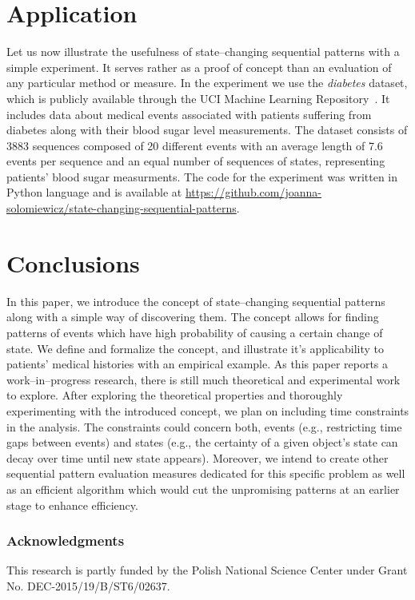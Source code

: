 \documentclass[runningheads,a4paper]{llncs}
\begin{document}
\section{Application}
Let us now illustrate the usefulness of state--changing sequential patterns with a simple experiment.
It serves rather as a proof of concept than an evaluation of any particular method or measure.
In the experiment we use the \textit{diabetes} dataset, which is publicly available through the UCI Machine Learning Repository~\cite{Kahn:1994}.
It includes data about medical events associated with patients suffering from diabetes along with their blood sugar level measurements.
The dataset consists of 3883 sequences composed of 20 different events with an average length of 7.6 events per sequence and an equal number of sequences of states, representing patients' blood sugar measurments.
The code for the experiment was written in Python language and is available at \url{https://github.com/joanna-solomiewicz/state-changing-sequential-patterns}.



\section{Conclusions}
\label{sec:conclusions}
In this paper, we introduce the concept of state--changing sequential patterns along with a simple way of discovering them.
The concept allows for finding patterns of events which have high probability of causing a certain change of state.
We define and formalize the concept, and illustrate it's applicability to patients' medical histories with an empirical example.
As this paper reports a work--in--progress research, there is still much theoretical and experimental work to explore.
After exploring the theoretical properties and thoroughly experimenting with the introduced concept, we plan on including time constraints in the analysis.
The constraints could concern both, events (e.g., restricting time gaps between events) and states (e.g., the certainty of a given object's state can decay over time until new state appears).
Moreover, we intend to create other sequential pattern evaluation measures dedicated for this specific problem as well as an efficient algorithm which would cut the unpromising patterns at an earlier stage to enhance efficiency.

\subsubsection*{Acknowledgments} This research is partly funded by the Polish National Science Center under Grant No. DEC-2015/19/B/ST6/02637.



\end{document}
